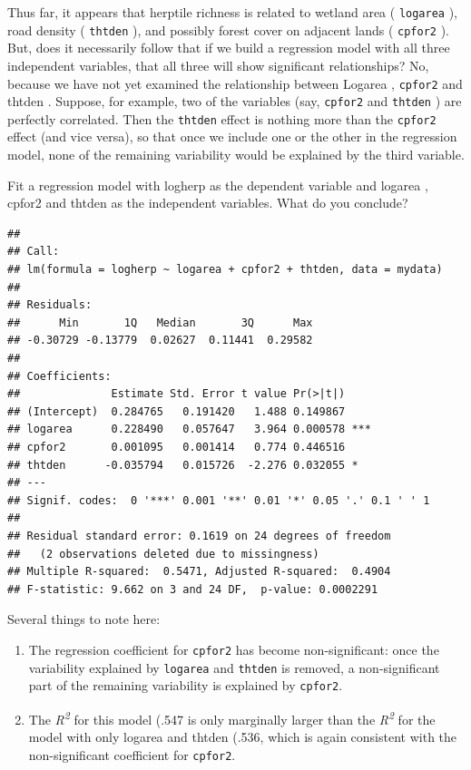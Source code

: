 \documentclass[
  12pt,
]{book}
\makeatletter
\providecommand{\tightlist}{%
  \setlength{\itemsep}{0pt}\setlength{\parskip}{0pt}}
\newenvironment{kframe}{%
\medskip{}
\setlength{\fboxsep}{.8em}
\def\at@end@of@kframe{}%
\ifinner\ifhmode%
 \def\at@end@of@kframe{\end{minipage}}%
 \begin{minipage}{\columnwidth}%
\fi\fi%
\def\FrameCommand##1{\hskip\@totalleftmargin \hskip-\fboxsep
\colorbox{incolor}{##1}\hskip-\fboxsep
    \hskip-\linewidth \hskip-\@totalleftmargin \hskip\columnwidth}%
\MakeFramed {\advance\hsize-\width
  \@totalleftmargin\z@ \linewidth\hsize
  \@setminipage}}%
{\par\unskip\endMakeFramed%
\at@end@of@kframe}
\newenvironment{rmdblock}[1]
 {
 \begin{itemize}
 \renewcommand{\labelitemi}{
   \raisebox{-.7\height}[0pt][0pt]{
     {\setkeys{Gin}{width=3em,keepaspectratio}\texttt{[image: images/\#1]}}
   }
 }
 \begin{kframe}
 \setlength{\fboxsep}{1em}
 \item
 }
 {
 \end{kframe}
 \end{itemize}
 }
\newenvironment{rmdcode}
  {\begin{rmdblock}{screen}}
  {\end{rmdblock}}
\makeatother
\begin{document}
Thus far, it appears that herptile richness is related to wetland area ( \texttt{logarea} ), road density ( \texttt{thtden} ), and possibly forest cover on adjacent lands ( \texttt{cpfor2} ). But, does it necessarily follow that if we build a regression model with all three independent variables, that all three will show significant relationships? No, because we have not yet examined the relationship between Logarea , \texttt{cpfor2} and thtden . Suppose, for example, two of the variables (say, \texttt{cpfor2} and \texttt{thtden} ) are perfectly correlated. Then the \texttt{thtden} effect is nothing more than the \texttt{cpfor2} effect (and vice versa), so that once we include one or the other in the regression model, none of the remaining variability would be explained by the third variable.

\begin{rmdcode}
Fit a regression model with logherp as the dependent variable and logarea , cpfor2 and thtden as the independent variables. What do you conclude?
\end{rmdcode}

\begin{verbatim}
## 
## Call:
## lm(formula = logherp ~ logarea + cpfor2 + thtden, data = mydata)
## 
## Residuals:
##      Min       1Q   Median       3Q      Max 
## -0.30729 -0.13779  0.02627  0.11441  0.29582 
## 
## Coefficients:
##              Estimate Std. Error t value Pr(>|t|)    
## (Intercept)  0.284765   0.191420   1.488 0.149867    
## logarea      0.228490   0.057647   3.964 0.000578 ***
## cpfor2       0.001095   0.001414   0.774 0.446516    
## thtden      -0.035794   0.015726  -2.276 0.032055 *  
## ---
## Signif. codes:  0 '***' 0.001 '**' 0.01 '*' 0.05 '.' 0.1 ' ' 1
## 
## Residual standard error: 0.1619 on 24 degrees of freedom
##   (2 observations deleted due to missingness)
## Multiple R-squared:  0.5471, Adjusted R-squared:  0.4904 
## F-statistic: 9.662 on 3 and 24 DF,  p-value: 0.0002291
\end{verbatim}

Several things to note here:

\begin{enumerate}
\def\labelenumi{\arabic{enumi}.}
\tightlist
\item
  The regression coefficient for \texttt{cpfor2} has become non-significant: once the variability explained by \texttt{logarea} and \texttt{thtden} is removed, a non-significant part of the remaining variability is explained by \texttt{cpfor2}.
\item
  The \emph{R\textsuperscript{2}} for this model (.547 is only marginally larger than the \emph{R\textsuperscript{2}} for the model with only logarea and thtden (.536, which is again consistent with the non-significant coefficient for \texttt{cpfor2}.
\end{enumerate}
\end{document}
